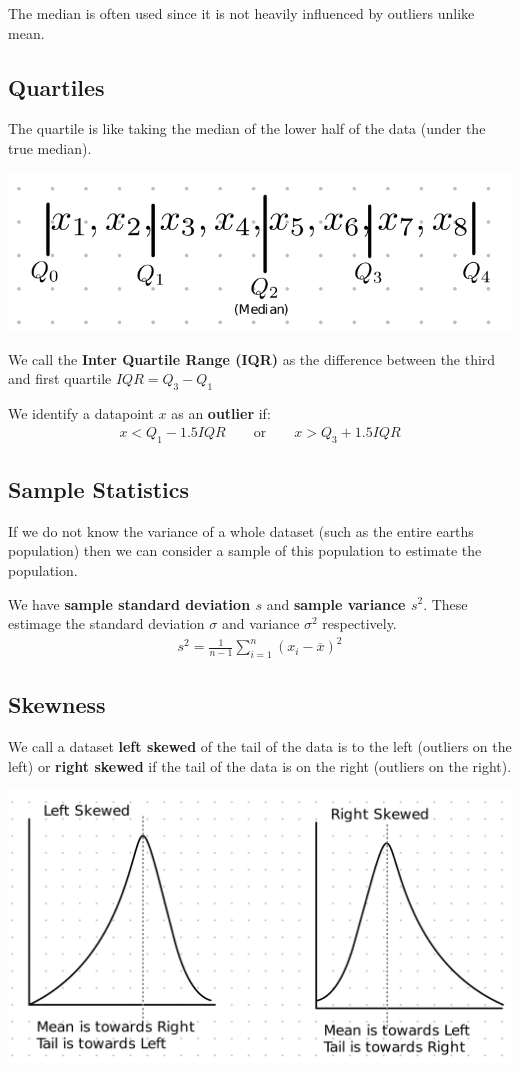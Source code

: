 \documentclass[12pt,letterpaper]{article} \usepackage{amsmath} \usepackage{graphicx} \usepackage[margin=1in]{geometry} \usepackage{longtable}  \usepackage{amssymb}
\begin{document}
	The median is often used since it is not heavily influenced by outliers unlike mean. 
	
	\subsection{Quartiles}
	The quartile is like taking the median of the lower half of the data (under the true median). 
	\begin{center}
		\includegraphics[width=0.4\linewidth]{quartiles}
	\end{center}
	We call the \textbf{Inter Quartile Range (IQR)} as the difference between the third and first quartile $IQR = Q_3-Q_1$

	We identify a datapoint $x$ as an \textbf{outlier} if:
	\begin{align*}
		x < Q_1 - 1.5IQR \qquad \text{or} \qquad x>Q_3 + 1.5IQR
	\end{align*}

	\subsection{Sample Statistics}
	If we do not know the variance of a whole dataset (such as the entire earths population) then we can consider a sample of this population to estimate the population. 
	
	We have \textbf{sample standard deviation $s$} and \textbf{sample variance $s^2$}. These estimage the standard deviation $\sigma$ and variance $\sigma^2$ respectively. 
	\begin{align*}
		s^2 = \frac{1}{n-1}\sum^{n}_{i=1}(x_i - \overline x)^2
	\end{align*}

	\subsection{Skewness}
	We call a dataset \textbf{left skewed} of the tail of the data is to the left (outliers on the left) or \textbf{right skewed} if the tail of the data is on the right (outliers on the right).
	\begin{center}
		\includegraphics[width=0.6\linewidth]{skew}
	\end{center}
\end{document}
